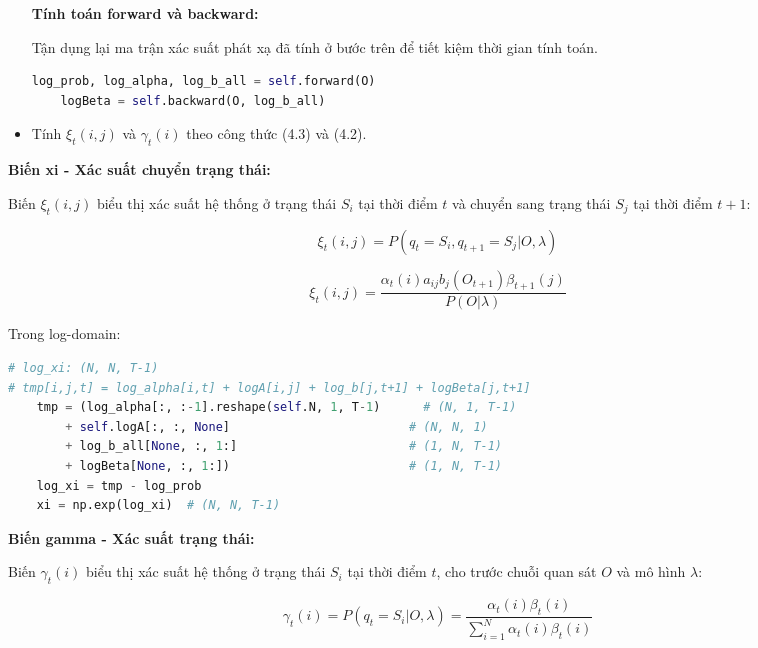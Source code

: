 \documentclass[twoside, final]{hcmut_report}
\begin{document}
\begin{itemize}
\textbf{Tính toán forward và backward:}

Tận dụng lại ma trận xác suất phát xạ đã tính ở bước trên để tiết kiệm thời gian tính toán.
\begin{tcolorbox}
\begin{lstlisting}[language=Python]
    log_prob, log_alpha, log_b_all = self.forward(O)
    logBeta = self.backward(O, log_b_all)
\end{lstlisting}
\end{tcolorbox}

    \item Tính $\xi_t(i,j)$ và $\gamma_t(i)$ theo công thức (4.3) và (4.2).
\end{itemize}

\textbf{Biến xi - Xác suất chuyển trạng thái:}

Biến $\xi_t(i,j)$ biểu thị xác suất hệ thống ở trạng thái $S_i$ tại thời điểm $t$ và chuyển sang trạng thái $S_j$ tại thời điểm $t+1$:

\begin{equation}
\xi_t(i,j) = P(q_t = S_i, q_{t+1} = S_j | O, \lambda)
\end{equation}

\begin{equation}
\xi_t(i,j) = \frac{\alpha_t(i) a_{ij} b_j(O_{t+1}) \beta_{t+1}(j)}{P(O|\lambda)} \tag{4.3}
\end{equation}

Trong log-domain:

\begin{tcolorbox}
\begin{lstlisting}[language=Python]
# log_xi: (N, N, T-1)
# tmp[i,j,t] = log_alpha[i,t] + logA[i,j] + log_b[j,t+1] + logBeta[j,t+1]
    tmp = (log_alpha[:, :-1].reshape(self.N, 1, T-1)      # (N, 1, T-1)
        + self.logA[:, :, None]                         # (N, N, 1)
        + log_b_all[None, :, 1:]                        # (1, N, T-1)
        + logBeta[None, :, 1:])                         # (1, N, T-1)
    log_xi = tmp - log_prob
    xi = np.exp(log_xi)  # (N, N, T-1)
\end{lstlisting}
\end{tcolorbox}

\textbf{Biến gamma - Xác suất trạng thái:}

Biến $\gamma_t(i)$ biểu thị xác suất hệ thống ở trạng thái $S_i$ tại thời điểm $t$, cho trước chuỗi quan sát $O$ và mô hình $\lambda$:

\begin{equation}
\gamma_t(i) = P(q_t = S_i | O, \lambda) = \frac{\alpha_t(i)\beta_t(i)}{\sum_{i=1}^{N} \alpha_t(i)\beta_t(i)} \tag{4.2}
\end{equation}
\end{document}
